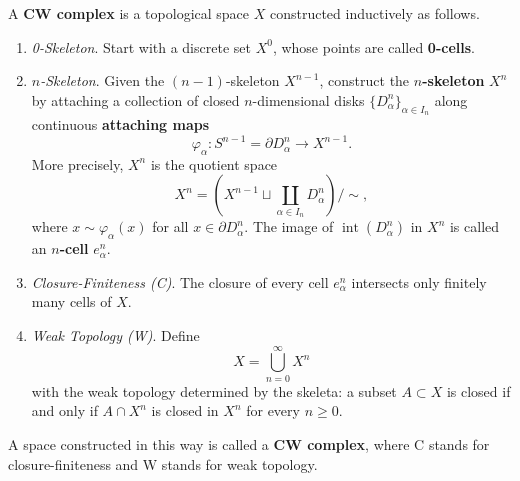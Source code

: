 	\begin{definition}
	  \label{def:cell-complex}
		A \textbf{CW complex} is a topological space $X$ constructed inductively as follows.
		\begin{enumerate}
			\item \textit{0-Skeleton}. Start with a discrete set $X^0$, whose points are called \textbf{0-cells}.

			\item \textit{$n$-Skeleton}. Given the $(n-1)$-skeleton $X^{n-1}$, construct the \textbf{$n$-skeleton} $X^n$ by attaching a collection of closed $n$-dimensional disks $\{D_\alpha^n\}_{\alpha \in I_n}$ along continuous \textbf{attaching maps}
				\begin{equation}
					\varphi_\alpha: S^{n-1} = \partial D_\alpha^n \to X^{n-1}.
				\end{equation}
				More precisely, $X^n$ is the quotient space
				\begin{equation}
					X^n = \left( X^{n-1} \sqcup \coprod_{\alpha \in I_n} D_\alpha^n \right) \big/ \sim,
				\end{equation}
				where $x \sim \varphi_\alpha(x)$ for all $x \in \partial D_\alpha^n$. The image of $\operatorname{int}(D_\alpha^n)$ in $X^n$ is called an \textbf{$n$-cell} $e_\alpha^n$.

			\item \textit{Closure-Finiteness (C)}. The closure of every cell $e_\alpha^n$ intersects only finitely many cells of $X$.

			\item \textit{Weak Topology (W)}. Define
				\begin{equation}
					X = \bigcup_{n=0}^\infty X^n
				\end{equation}
				with the weak topology determined by the skeleta: a subset $A \subset X$ is closed if and only if $A \cap X^n$ is closed in $X^n$ for every $n \geq 0$.
		\end{enumerate}
		A space constructed in this way is called a \textbf{CW complex}, where C stands for closure-finiteness and W stands for weak topology.
	\end{definition}

